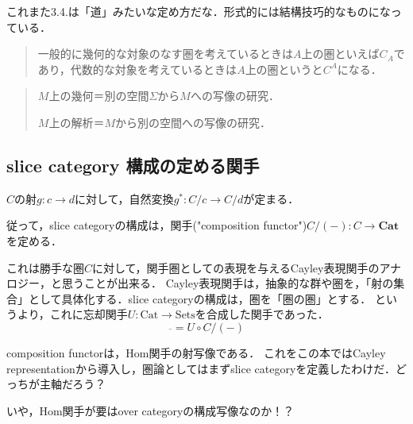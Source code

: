 \documentclass[uplatex, 12pt, dvipdfmx]{jsarticle}
\begin{document}
\begin{remark*}
    これまた3.4.は「道」みたいな定め方だな．形式的には結構技巧的なものになっている．
    \begin{quote}
        一般的に幾何的な対象のなす圏を考えているときは$A$上の圏といえば$C_A$であり，代数的な対象を考えているときは$A$上の圏というと$C^A$になる．
    \end{quote}
\end{remark*}
\begin{remark*}[Gromov]
    \begin{definition*}
        \begin{quotation}
            $M$上の幾何＝別の空間$\Sigma$から$M$への写像の研究．

            $M$上の解析＝$M$から別の空間への写像の研究．
        \end{quotation}
    \end{definition*}
\end{remark*}

\subsection*{slice category 構成の定める関手}

$C$の射$g:c\to d$に対して，自然変換$g^*:C/c\to C/d$が定まる．
\begin{center}\end{center}

従って，slice categoryの構成は，関手("composition functor")$C/(-):C\to \mathbf{Cat}$を定める．

これは勝手な圏$C$に対して，関手圏としての表現を与えるCayley表現関手のアナロジー，と思うことが出来る．
Cayley表現関手は，抽象的な群や圏を，「射の集合」として具体化する．slice categoryの構成は，圏を「圏の圏」とする．
というより，これに忘却関手$U:\mathrm{Cat}\to\mathrm{Sets}$を合成した関手であった．
\[ \overline{　} = U\circ C/(-) \]

\begin{remark*}
    composition functorは，Hom関手の射写像である．
    これをこの本ではCayley representationから導入し，圏論としてはまずslice categoryを定義したわけだ．どっちが主軸だろう？

    いや，Hom関手が要はover categoryの構成写像なのか！？
\end{remark*}
\end{document}
